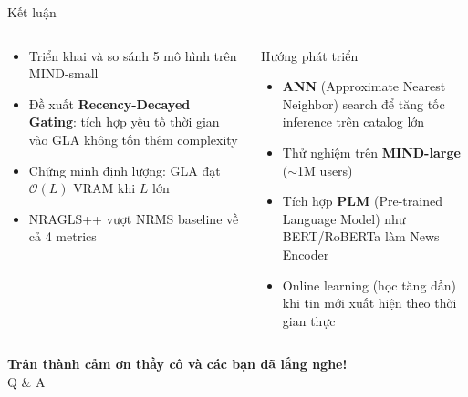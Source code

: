 \documentclass[aspectratio=169,11pt]{beamer}
\newcommand{\faCheckCircle}{$\checkmark$}
\begin{document}
\begin{frame}{Kết luận}
  \begin{columns}[T]
      \begin{keybox}[title={\faCheckCircle\ Những gì đã đạt được}]
        \begin{itemize}
          \item Triển khai và so sánh 5 mô hình trên MIND-small
          \item Đề xuất \textbf{Recency-Decayed Gating}: tích hợp yếu tố thời gian vào GLA không tốn thêm complexity
          \item Chứng minh định lượng:
            GLA đạt $\mathcal{O}(L)$ VRAM khi $L$ lớn
          \item NRAGLS++ vượt NRMS baseline về cả 4 metrics
        \end{itemize}
      \end{keybox}

      \begin{exampleblock}{Hướng phát triển}
        \begin{itemize}
          \item \textbf{ANN} (Approximate Nearest Neighbor)
            search để tăng tốc inference trên catalog lớn
          \item Thử nghiệm trên \textbf{MIND-large}
            ($\sim$1M users)
          \item Tích hợp \textbf{PLM} (Pre-trained Language Model)
            như BERT/RoBERTa làm News Encoder
          \item Online learning (học tăng dần) khi
            tin mới xuất hiện theo thời gian thực
        \end{itemize}
      \end{exampleblock}
  \end{columns}

\end{frame}

\begin{frame}
  \begin{center}
    {\Huge\bfseries\color{ptitblue} Trân thành cảm ơn thầy cô và các bạn đã lắng nghe!}\\[1.2em]
    {\Large Q \& A}\\[2em]
  \end{center}
\end{frame}
\end{document}

